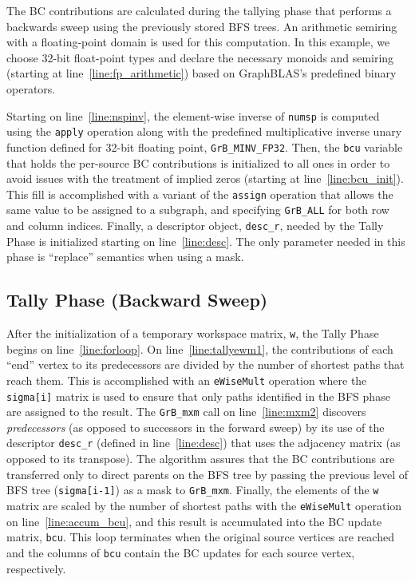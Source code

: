 The BC contributions are calculated during the tallying phase that 
performs a backwards sweep using the previously stored BFS trees.  An 
arithmetic semiring with a floating-point
domain is used for this computation.  In this example, we choose 32-bit float-point types and declare
the necessary monoids and semiring (starting at line~\ref{line:fp_arithmetic})
based on GraphBLAS's predefined binary operators.

Starting on line~\ref{line:nspinv}, the element-wise inverse of {\tt numsp} is 
computed using the {\tt apply} operation along with the predefined multiplicative inverse
unary function defined for 32-bit floating point, {\tt GrB\_MINV\_FP32}.
Then, the {\tt bcu} variable that holds the per-source BC contributions is initialized
to all ones in order to avoid issues with the treatment of implied zeros (starting at 
line~\ref{line:bcu_init}). This fill is accomplished with a variant of the {\tt assign} 
operation that allows the same value to be assigned to a subgraph, and specifying 
{\tt GrB\_ALL} for both row and column indices.
Finally, a descriptor object, {\tt desc\_r}, needed by the Tally Phase is 
initialized starting on line~\ref{line:desc}.  The only parameter needed in this
phase is ``replace'' semantics when using a mask. 


\subsection{Tally Phase (Backward Sweep)}

After the initialization of a temporary workspace matrix, {\tt w}, the Tally
Phase begins on line~\ref{line:forloop}.  
On line~\ref{line:tallyewm1}, the contributions of each ``end'' vertex to its 
predecessors are divided by the number of shortest paths that reach them. This is accomplished
with an {\tt eWiseMult} operation where the {\tt sigma[i]} matrix is
used to ensure that only paths identified in the BFS phase are assigned to
the result.
The {\tt GrB\_mxm} call on line~\ref{line:mxm2} discovers \emph{predecessors} (as opposed to 
successors in the forward sweep) by its use of the descriptor {\tt desc\_r} 
(defined in line~\ref{line:desc}) that uses the 
adjacency matrix (as opposed to its transpose). The algorithm assures that the BC contributions are 
transferred only to direct parents on the BFS tree by passing the previous 
level of BFS tree ({\tt sigma[i-1]}) as a mask to {\tt GrB\_mxm}. 
Finally, the elements of the {\tt w} matrix are scaled by the number of shortest
paths with the {\tt eWiseMult} operation on line~\ref{line:accum_bcu}, and this result
is accumulated into the BC update matrix, {\tt bcu}.
This loop terminates when the original source vertices are reached and the columns
of {\tt bcu} contain the BC updates for each source vertex, respectively.

